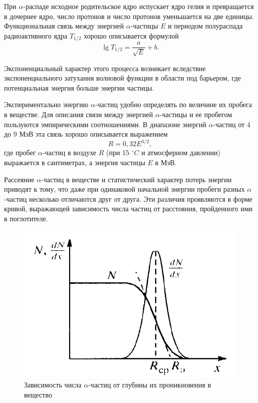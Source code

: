 \documentclass[a4paper, 12pt]{article}%
\begin{document}
    При $\alpha$-распаде исходное родительское ядро испускает ядро гелия и превращается в дочернее ядро, число протонов и число протонов уменьшается на две единицы. Функциональная связь между энергией $\alpha$-частицы $E$ и периодом полураспада радиоактивного ядра $T_{1/2}$ хорошо описывается формулой
	\begin{equation*}
		 \lg T_{1/2} = \frac{a}{\sqrt{E}} + b.
	\end{equation*}

	Экспоненциальный характер этого процесса возникает вследствие экспоненциального затухания волновой функции в области под барьером, где потенциальная энергия больше энергии частицы.


    Экспериментально энергию $\alpha$-частиц удобно определять по величине их пробега в веществе.
	Для описания связи между энергией $\alpha$-частицы и ее пробегом пользуются эмпирическими соотношениями. В диапазоне энергий $\alpha$-частиц от $4$ до $9$ МэВ эта связь хорошо описывается выражением
	\begin{equation}
		R = 0,32 E^{3/2},
	\end{equation}
    где пробег $\alpha$-частиц в воздухе $R$ (при 15 $^\circ C$ и атмосферном давлении) выражается в сантиметрах, а энергия частицы $E$ в МэВ.

    Рассеяние $\alpha$-частиц в веществе и статистический характер потерь энергии приводят к тому, что даже при одинаковой начальной энергии пробеги разных $\alpha$-частиц несколько отличаются друг от друга. Эти различия проявляются в форме кривой, выражающей зависимость числа частиц от расстояния, пройденного ими в поглотителе.

    \begin{figure}[h!]
        \centering
        \includegraphics[width = 8.5 cm]{pic1.png}
        \caption{Зависимость числа $\alpha$-частиц от глубины их проникновения в вещество}
        \label{}
    \end{figure}
\end{document}
